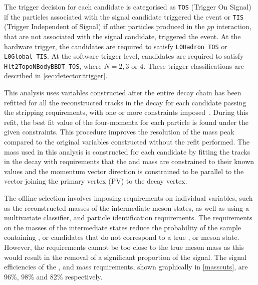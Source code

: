 The trigger decision for each candidate is categorised as {\tt TOS} (Trigger On Signal) if the particles associated with the signal candidate triggered the event or {\tt TIS} (Trigger Independent of Signal) if other particles produced in the $pp$ interaction, that are not associated with the signal candidate, triggered the event. At the hardware trigger, the \Bm candidates are required to satisfy {\tt L0Hadron TOS} or {\tt L0Global TIS}. At the software trigger level, \Bm candidates are required to satisfy {\tt Hlt2TopoNBodyBBDT TOS}, where $N = 2,3 \text{ or } 4$. These trigger classifications are described in \sect\ref{sec:detector:trigger}.

This analysis uses variables constructed after the entire decay chain has been refitted for all the reconstructed tracks in the decay for each \Bm candidate passing the stripping requirements, with one or more constraints imposed~\cite{Hulsbergen:2005pu}. During this refit, the best fit value of the four-momenta for each particle is found under the given constraints. This procedure improves the resolution of the \Bm mass peak compared to the original variables constructed without the refit performed. The \Bm mass used in this analysis is constructed for each \Bm candidate by fitting the tracks in the decay with requirements that the \Dz and \KS mass are constrained to their known values and the \Bm momentum vector direction is constrained to be parallel to the vector joining the primary vertex (PV) to the \Bm decay vertex.

The offline selection involves imposing requirements on individual variables, such as the reconstructed masses of the intermediate meson states, as well as using a multivariate classifier, and particle identification requirements. The requirements on the masses of the intermediate states reduce the probability of the sample containing \Dz, \KS or \Kstar candidates that do not correspond to a true \Dz, \KS or \Kstar meson state. However, the requirements cannot be too close to the true meson mass as this would result in the removal of a significant proportion of the signal. The signal efficiencies of the \Dz, \KS and \Kstar mass requirements, shown graphically in \fig\ref{masscuts}, are 96\%, 98\% and 82\% respectively. 

